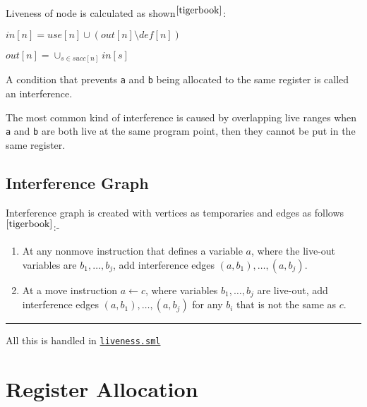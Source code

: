 Liveness of node is calculated as shown$^{\cite{tigerbook}}$:

\(in[n] = use[n] \cup (out[n] \setminus def[n])\)

\(out[n] = \cup_{s \in succ[n]} in[s]\)

A condition that prevents
\texttt{a} and
\texttt{b} being
allocated to the same register is called an interference.

The most common kind of interference is caused by overlapping live
ranges when
\texttt{a} and
\texttt{b} are
both live at the same program point, then they cannot be put in the same
register.

\hypertarget{interference-graph}{%
\subsection{Interference Graph}\label{interference-graph}}

Interference graph is created with vertices as temporaries and edges as
follows$^{\cite{tigerbook}}$:-

\begin{enumerate}
\def\labelenumi{\arabic{enumi}.}
\item
  At any nonmove instruction that defines a variable \(a\), where the
  live-out variables are \(b_1, \dots, b_j\), add interference edges
  \((a, b_1), \dots, (a, b_j)\).
\item
  At a move instruction \(a \leftarrow c\), where variables
  \(b_1, \dots, b_j\) are live-out, add interference edges
  \((a, b_1), \dots, (a, b_j)\) for any \(b_i\) that is not the same as
  \(c\).
\end{enumerate}

\begin{center}\rule{0.5\linewidth}{\linethickness}\end{center}

All this is handled in
\href{https://www.github.com/sourabh2311/btp/tree/master/Compiler/liveness.sml}{\texttt{liveness.sml}}

\section{Register Allocation}

